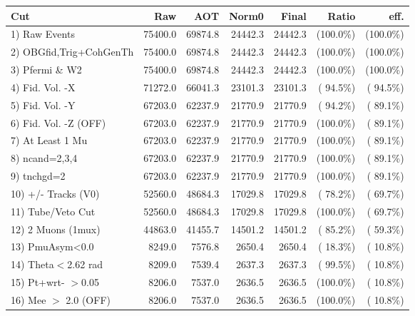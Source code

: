  \begin{table}[h!]\centering
 \begin{tabular}{||l||r|r|r|r|r|r||}
 \hline
 \hline
 Cut & Raw & AOT & Norm0 & Final & Ratio & eff.       \\
 \hline
  1) Raw Events           &      75400.0 &      69874.8 &      24442.3 &      24442.3 & (100.0\%) & (100.0\%) \\
  2) OBGfid,Trig+CohGenTh &      75400.0 &      69874.8 &      24442.3 &      24442.3 & (100.0\%) & (100.0\%) \\
  3) Pfermi \& W2         &      75400.0 &      69874.8 &      24442.3 &      24442.3 & (100.0\%) & (100.0\%) \\
  4) Fid. Vol. -X         &      71272.0 &      66041.3 &      23101.3 &      23101.3 & ( 94.5\%) & ( 94.5\%) \\
  5) Fid. Vol. -Y         &      67203.0 &      62237.9 &      21770.9 &      21770.9 & ( 94.2\%) & ( 89.1\%) \\
  6) Fid. Vol. -Z (OFF)   &      67203.0 &      62237.9 &      21770.9 &      21770.9 & (100.0\%) & ( 89.1\%) \\
  7) At Least 1 Mu        &      67203.0 &      62237.9 &      21770.9 &      21770.9 & (100.0\%) & ( 89.1\%) \\
  8) ncand=2,3,4          &      67203.0 &      62237.9 &      21770.9 &      21770.9 & (100.0\%) & ( 89.1\%) \\
  9) tnchgd=2             &      67203.0 &      62237.9 &      21770.9 &      21770.9 & (100.0\%) & ( 89.1\%) \\
 10) +/- Tracks (V0)      &      52560.0 &      48684.3 &      17029.8 &      17029.8 & ( 78.2\%) & ( 69.7\%) \\
 11) Tube/Veto Cut        &      52560.0 &      48684.3 &      17029.8 &      17029.8 & (100.0\%) & ( 69.7\%) \\
 12) 2 Muons (1mux)       &      44863.0 &      41455.7 &      14501.2 &      14501.2 & ( 85.2\%) & ( 59.3\%) \\
 13) PmuAsym<0.0          &       8249.0 &       7576.8 &       2650.4 &       2650.4 & ( 18.3\%) & ( 10.8\%) \\
 14) Theta$<$2.62 rad     &       8209.0 &       7539.4 &       2637.3 &       2637.3 & ( 99.5\%) & ( 10.8\%) \\
 15) Pt+wrt- $>$0.05      &       8206.0 &       7537.0 &       2636.5 &       2636.5 & (100.0\%) & ( 10.8\%) \\
 16) Mee $>$ 2.0  (OFF)   &       8206.0 &       7537.0 &       2636.5 &       2636.5 & (100.0\%) & ( 10.8\%) \\

\end{tabular}
\end{table}
